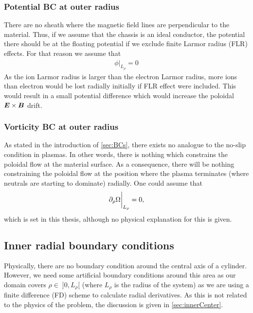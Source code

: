 \subsubsection{Potential BC at outer radius}
%
There are no sheath where the magnetic field lines are perpendicular to the material.
Thus, if we assume that the chassis is an ideal conductor, the potential there should be at the floating potential if we exclude finite Larmor radius (FLR) effects.
For that reason we assume that
%
\begin{align*}
    \phi \bigg|_{L_\rho} = 0
\end{align*}
%
As the ion Larmor radius is larger than the electron Larmor radius, more ions than electron would be lost radially initially if FLR effect were included.
This would result in a small potential difference which would increase the poloidal $\boldsymbol{E}\times\boldsymbol{B}$ drift.

\subsubsection{Vorticity BC at outer radius}
%
As stated in the introduction of \cref{sec:BCs}, there exists no analogue to the no-slip condition in plasmas.
In other words, there is nothing which constrains the poloidal flow at the material surface.
As a consequence, there will be nothing constraining the poloidal flow at the position where the plasma terminates (where neutrals are starting to dominate) radially.
One could assume that
%
\begin{align*}
    \partial_\rho \Omega \bigg|_{L_\rho} = 0,
\end{align*}
%
which is set in this thesis, although no physical explanation for this is given.

\subsection{Inner radial boundary conditions}
\label{sec:BCInnerRho}
%
Physically, there are no boundary condition around the central axis of a cylinder.
However, we need some artificial boundary conditions around this area as our domain covers $\rho \in \; ]0, L_\rho[$ (where $L_\rho$ is the radius of the system) as we are using a finite difference (FD) scheme to calculate radial derivatives.
As this is not related to the physics of the problem, the discussion is given in \cref{sec:innerCenter}.
